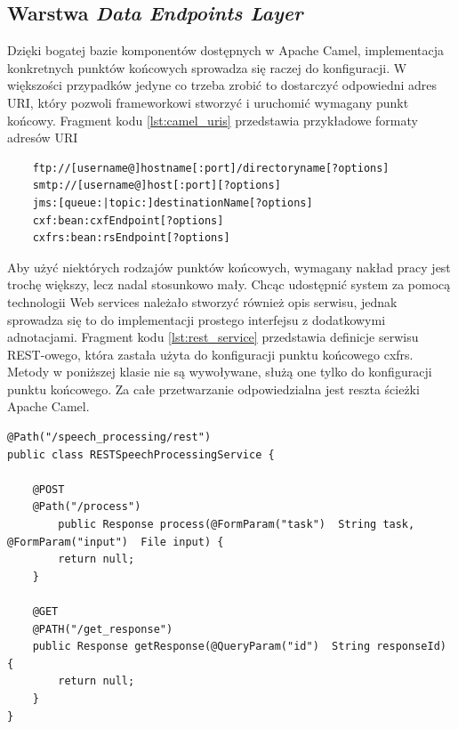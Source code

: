 \subsection{Warstwa \textit{Data Endpoints Layer}}

Dzięki bogatej bazie komponentów dostępnych w Apache Camel, implementacja konkretnych punktów końcowych sprowadza się raczej do konfiguracji. W większości przypadków jedyne co trzeba zrobić to dostarczyć odpowiedni adres URI, który pozwoli frameworkowi stworzyć i uruchomić wymagany punkt końcowy. Fragment kodu \ref{lst:camel_uris} przedstawia przykładowe formaty adresów URI

\lstset{language=Java, tabsize=4, caption=Przykładowe formaty adresów URI dla punktów końcowych Apache Camel.,label=lst:camel_uris}

\begin{center}
\begin{lstlisting}
	ftp://[username@]hostname[:port]/directoryname[?options]
	smtp://[username@]host[:port][?options]
	jms:[queue:|topic:]destinationName[?options]
	cxf:bean:cxfEndpoint[?options]
	cxfrs:bean:rsEndpoint[?options]
\end{lstlisting}
\end{center}

Aby użyć niektórych rodzajów punktów końcowych, wymagany nakład pracy jest trochę większy, lecz nadal stosunkowo mały. Chcąc udostępnić system za pomocą technologii Web services należało stworzyć również opis serwisu, jednak sprowadza się to do implementacji prostego interfejsu z dodatkowymi adnotacjami.  Fragment kodu \ref{lst:rest_service} przedstawia definicje serwisu REST-owego, która zastała użyta do konfiguracji punktu końcowego cxfrs. Metody w poniższej klasie nie są wywoływane, służą one tylko do konfiguracji punktu końcowego. Za całe przetwarzanie odpowiedzialna jest reszta ścieżki Apache Camel.


\lstset{language=Java, tabsize=4, caption=Definicja REST-owego punktu końcowego.,label=lst:rest_service}


\begin{center}
\begin{lstlisting}
@Path("/speech_processing/rest")
public class RESTSpeechProcessingService {

	@POST
	@Path("/process")
    	public Response process(@FormParam("task")  String task, @FormParam("input")  File input) {
		return null;
	}

	@GET
	@PATH("/get_response")
	public Response getResponse(@QueryParam("id")  String responseId) {
		return null;
	}
}

\end{lstlisting}
\end{center}

